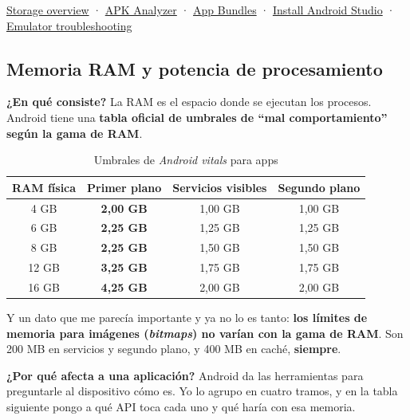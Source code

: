 \documentclass[11pt,a4paper]{article}
\newcommand{\campo}[1]{\textbf{\color{ink}#1}}
\begin{document}
	\begin{fuentesbox}
		\href{https://developer.android.com/training/data-storage}{Storage overview} ·
		\href{https://developer.android.com/studio/debug/apk-analyzer}{APK Analyzer} ·
		\href{https://developer.android.com/guide/app-bundle/dynamic-delivery}{App Bundles} ·
		\href{https://developer.android.com/studio/install}{Install Android Studio} ·
		\href{https://developer.android.com/studio/run/emulator-troubleshooting}{Emulator troubleshooting}
	\end{fuentesbox}
	
	\subsection{Memoria RAM y potencia de procesamiento}
	
	\campo{¿En qué consiste?}
	La RAM es el espacio donde se ejecutan los procesos. Android tiene una \textbf{tabla oficial de umbrales de \enquote{mal comportamiento} según la gama de RAM}.
	
	\begin{table}[htbp]
		\centering
		\small
		\begin{tabular}{@{}c c c c@{}}
			\toprule
			\rowcolor{primary}
			\textcolor{paper}{\sffamily\bfseries RAM física} & \textcolor{paper}{\sffamily\bfseries Primer plano} & \textcolor{paper}{\sffamily\bfseries Servicios visibles} & \textcolor{paper}{\sffamily\bfseries Segundo plano} \\
			\midrule
			4 GB & \textbf{2,00 GB} & 1,00 GB & 1,00 GB \\
			\rowcolor{soft}
			6 GB & \textbf{2,25 GB} & 1,25 GB & 1,25 GB \\
			8 GB & \textbf{2,25 GB} & 1,50 GB & 1,50 GB \\
			\rowcolor{soft}
			12 GB & \textbf{3,25 GB} & 1,75 GB & 1,75 GB \\
			16 GB & \textbf{4,25 GB} & 2,00 GB & 2,00 GB \\
			\bottomrule
		\end{tabular}
		\caption{Umbrales de \emph{Android vitals} para apps}
	\end{table}
	
	Y un dato que me parecía importante y ya no lo es tanto: \textbf{los límites de memoria para imágenes (\emph{bitmaps}) no varían con la gama de RAM}. Son 200 MB en servicios y segundo plano, y 400 MB en caché, \textbf{siempre}.
	
	\campo{¿Por qué afecta a una aplicación?}
	Android da las herramientas para preguntarle al dispositivo cómo es. Yo lo agrupo en cuatro tramos, y en la tabla siguiente pongo a qué API toca cada uno y qué haría con esa memoria.
	
\end{document}

